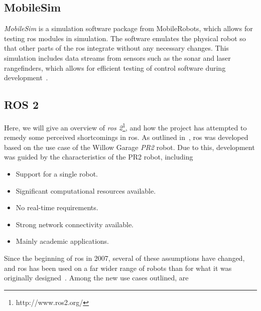 \documentclass[\rootfolder/main.tex]{subfiles}
\begin{document}

\subsection{MobileSim}

\emph{MobileSim} is a simulation software package from MobileRobots, which allows for testing \acrshort{ros} modules in simulation.
The software emulates the physical robot so that other parts of the \acrshort{ros} integrate without any necessary changes.
This simulation includes data streams from sensors such as the sonar and laser rangefinders, which allows for efficient testing of control software during development~\cite{MobileSim}.


\subsection{ROS 2}

Here, we will give an overview of \emph{\acrshort{ros} 2}\footnote{http://www.ros2.org/}, and how the project has attempted to remedy some perceived shortcomings in \acrshort{ros}.
As outlined in~\cite{Gerkey2017}, \acrshort{ros} was developed based on the use case of the Willow Garage \emph{PR2} robot.
Due to this, development was guided by the characteristics of the PR2 robot, including

\begin{itemize}
    \item Support for a single robot.
    \item Significant computational resources available.
    \item No real-time requirements.
    \item Strong network connectivity available.
    \item Mainly academic applications.
\end{itemize}

Since the beginning of \acrshort{ros} in 2007, several of these assumptions have changed, and \acrshort{ros} has been used on a far wider range of robots than for what it was originally designed~\cite{Gerkey2017}.
Among the new use cases outlined, are
\end{document}
